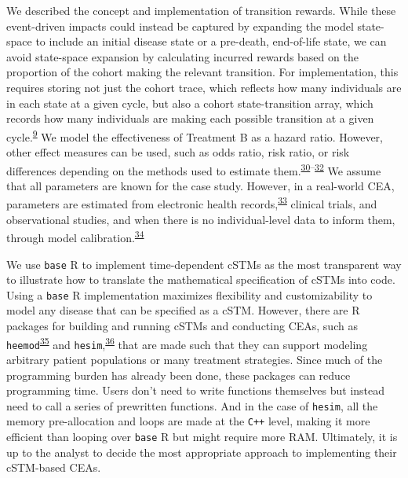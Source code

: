 \documentclass[
]{article}
\begin{document}
We described the concept and implementation of transition rewards. While these event-driven impacts could instead be captured by expanding the model state-space to include an initial disease state or a pre-death, end-of-life state, we can avoid state-space expansion by calculating incurred rewards based on the proportion of the cohort making the relevant transition. For implementation, this requires storing not just the cohort trace, which reflects how many individuals are in each state at a given cycle, but also a cohort state-transition array, which records how many individuals are making each possible transition at a given cycle.\textsuperscript{\protect\hyperlink{ref-Krijkamp2019}{9}} We model the effectiveness of Treatment B as a hazard ratio. However, other effect measures can be used, such as odds ratio, risk ratio, or risk differences depending on the methods used to estimate them.\textsuperscript{\protect\hyperlink{ref-Kuntz2001}{30}--\protect\hyperlink{ref-Gidwani2020}{32}} We assume that all parameters are known for the case study. However, in a real-world CEA, parameters are estimated from electronic health records,\textsuperscript{\protect\hyperlink{ref-Rodriguez2021}{33}} clinical trials, and observational studies, and when there is no individual-level data to inform them, through model calibration.\textsuperscript{\protect\hyperlink{ref-Welton2005}{34}}

We use \texttt{base} R to implement time-dependent cSTMs as the most transparent way to illustrate how to translate the mathematical specification of cSTMs into code. Using a \texttt{base} R implementation maximizes flexibility and customizability to model any disease that can be specified as a cSTM. However, there are R packages for building and running cSTMs and conducting CEAs, such as \texttt{heemod}\textsuperscript{\protect\hyperlink{ref-Filipovic-Pierucci2017}{35}} and \texttt{hesim},\textsuperscript{\protect\hyperlink{ref-Incerti2021}{36}} that are made such that they can support modeling arbitrary patient populations or many treatment strategies. Since much of the programming burden has already been done, these packages can reduce programming time. Users don't need to write functions themselves but instead need to call a series of prewritten functions. And in the case of \texttt{hesim}, all the memory pre-allocation and loops are made at the \texttt{C++} level, making it more efficient than looping over \texttt{base} R but might require more RAM. Ultimately, it is up to the analyst to decide the most appropriate approach to implementing their cSTM-based CEAs.
\end{document}
